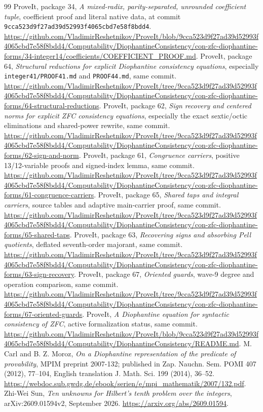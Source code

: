 \documentclass[11pt]{article}
\theoremstyle{definition}\newtheorem{definition}[theorem]{Definition}
\theoremstyle{remark}\newtheorem{remark}[theorem]{Remark}
\newcommand{\pin}{\texttt{9cca523d9f27ad39d52993f4065cbd7e58f8bdd4}}
\begin{document}
\begin{thebibliography}{99}
 ProveIt, package 34, \emph{A mixed-radix, parity-separated,
unrounded coefficient tuple}, coefficient proof and literal native data,
at commit \pin.
\url{https://github.com/VladimirReshetnikov/ProveIt/blob/9cca523d9f27ad39d52993f4065cbd7e58f8bdd4/Computability/DiophantineConsistency/con-zfc-diophantine-forms/34-integer14/coefficients/COEFFICIENT_PROOF.md}.
 ProveIt, package 64, \emph{Structural reductions for explicit
Diophantine consistency equations}, especially \texttt{integer41/PROOF41.md}
and \texttt{PROOF44.md}, same commit.
\url{https://github.com/VladimirReshetnikov/ProveIt/tree/9cca523d9f27ad39d52993f4065cbd7e58f8bdd4/Computability/DiophantineConsistency/con-zfc-diophantine-forms/64-structural-reductions}.
 ProveIt, package 62, \emph{Sign recovery and centered norms
for explicit ZFC consistency equations}, especially the exact sextic/octic
eliminations and shared-power rewrite, same commit.
\url{https://github.com/VladimirReshetnikov/ProveIt/tree/9cca523d9f27ad39d52993f4065cbd7e58f8bdd4/Computability/DiophantineConsistency/con-zfc-diophantine-forms/62-sign-and-norm}.
 ProveIt, package 61, \emph{Congruence carriers}, positive
13/12-variable proofs and signed-index lemma, same commit.
\url{https://github.com/VladimirReshetnikov/ProveIt/tree/9cca523d9f27ad39d52993f4065cbd7e58f8bdd4/Computability/DiophantineConsistency/con-zfc-diophantine-forms/61-congruence-carriers}.
 ProveIt, package 65, \emph{Shared taps and integral carriers},
source tables and adaptive main-carrier proof, same commit.
\url{https://github.com/VladimirReshetnikov/ProveIt/tree/9cca523d9f27ad39d52993f4065cbd7e58f8bdd4/Computability/DiophantineConsistency/con-zfc-diophantine-forms/65-shared-taps}.
 ProveIt, package 63, \emph{Recovering signs and absorbing
Pell quotients}, deflated seventh-order majorant, same commit.
\url{https://github.com/VladimirReshetnikov/ProveIt/tree/9cca523d9f27ad39d52993f4065cbd7e58f8bdd4/Computability/DiophantineConsistency/con-zfc-diophantine-forms/63-sign-recovery}.
 ProveIt, package 67, \emph{Oriented guards}, wave-9 degree
and operation comparison, same commit.
\url{https://github.com/VladimirReshetnikov/ProveIt/tree/9cca523d9f27ad39d52993f4065cbd7e58f8bdd4/Computability/DiophantineConsistency/con-zfc-diophantine-forms/67-oriented-guards}.
 ProveIt, \emph{A Diophantine equation for syntactic
consistency of ZFC}, active formalization status, same commit.
\url{https://github.com/VladimirReshetnikov/ProveIt/blob/9cca523d9f27ad39d52993f4065cbd7e58f8bdd4/Computability/DiophantineConsistency/README.md}.
 M. Carl and B. Z. Moroz, \emph{On a Diophantine
representation of the predicate of provability}, MPIM preprint 2007-132;
published in Zap. Nauchn. Sem. POMI 407 (2012), 77--104, English translation
J. Math. Sci. 199 (2014), 36--52.
\url{https://webdoc.sub.gwdg.de/ebook/serien/e/mpi_mathematik/2007/132.pdf}.
 Zhi-Wei Sun, \emph{Ten unknowns for Hilbert's tenth
problem over the integers}, arXiv:2609.01594v2, September 2026.
\url{https://arxiv.org/abs/2609.01594}.
\end{thebibliography}
\end{document}
